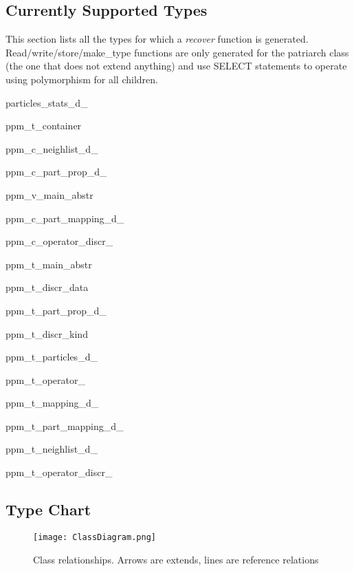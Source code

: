 \documentclass{article}
\begin{document}
\begin{tabular}{p{}p{}}
\end{tabular}

\subsection{Currently Supported Types}
This section lists all the types for which a \emph{recover} function is generated. Read/write/store/make\_type functions are only generated for the patriarch class (the one that does not extend anything) and use SELECT statements to operate using polymorphism for all children.
\begin{list}{}{}
\item particles\_stats\_d\_
\item ppm\_t\_container
\item ppm\_c\_neighlist\_d\_
\item ppm\_c\_part\_prop\_d\_
\item ppm\_v\_main\_abstr
\item ppm\_c\_part\_mapping\_d\_
\item ppm\_c\_operator\_discr\_
\item ppm\_t\_main\_abstr
\item ppm\_t\_discr\_data
\item ppm\_t\_part\_prop\_d\_
\item ppm\_t\_discr\_kind
\item ppm\_t\_particles\_d\_
\item ppm\_t\_operator\_
\item ppm\_t\_mapping\_d\_
\item ppm\_t\_part\_mapping\_d\_
\item ppm\_t\_neighlist\_d\_
\item ppm\_t\_operator\_discr\_
\end{list}

\subsection{Type Chart}
\begin{figure}[h!]
   \label{fig.typechart}
   \texttt{[image: ClassDiagram.png]}
   \caption{Class relationships. Arrows are extends, lines are reference relations}
\end{figure}
\end{document}
